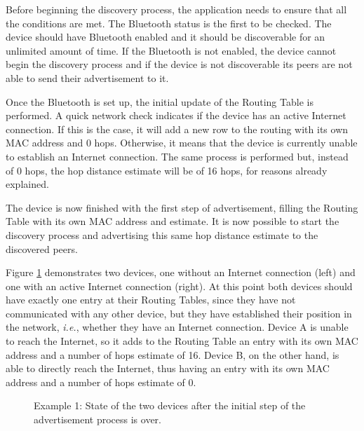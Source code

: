 Before beginning the discovery process, the application needs to ensure that all the conditions are met. The Bluetooth status is the first to be checked. The device should have Bluetooth enabled and it should be discoverable for an unlimited amount of time. If the Bluetooth is not enabled, the device cannot begin the discovery process and if the device is not discoverable its peers are not able to send their advertisement to it.

Once the Bluetooth is set up, the initial update of the Routing Table is performed. A quick network check indicates if the device has an active Internet connection. If this is the case, it will add a new row to the routing with its own \gls{MAC} address and 0 hops. Otherwise, it means that the device is currently unable to establish an Internet connection. The same process is performed but, instead of 0 hops, the hop distance estimate will be of 16 hops, for reasons already explained.

The device is now finished with the first step of advertisement, filling the Routing Table with its own \gls{MAC} address and estimate. It is now possible to start the discovery process and advertising this same hop distance estimate to the discovered peers.

Figure \ref{fig:adveg1} demonstrates two devices, one without an Internet connection (left) and one with an active Internet connection (right). At this point both devices should have exactly one entry at their Routing Tables, since they have not communicated with any other device, but they have established their position in the network, \textit{i.e.}, whether they have an Internet connection. Device A is unable to reach the Internet, so it adds to the Routing Table an entry with its own \gls{MAC} address and a number of hops estimate of 16. Device B, on the other hand, is able to directly reach the Internet, thus having an entry with its own \gls{MAC} address and a number of hops estimate of 0.

\begin{figure}[ht]
	\noindent{}
	\caption{\label{fig:adveg1} Example 1: State of the two devices after the initial step of the advertisement process is over.}
\end{figure}

